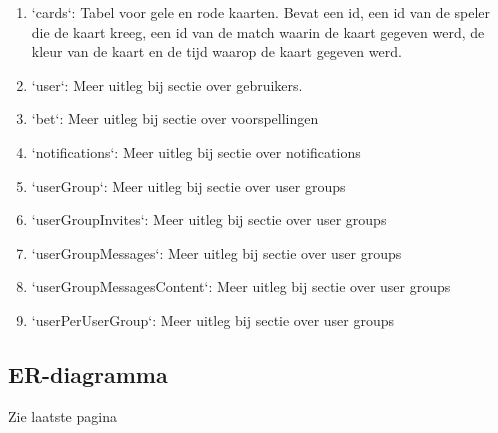 \documentclass[11pt, a4paper]{article}
\begin{document}
\begin{enumerate}
\item `cards`: Tabel voor gele en rode kaarten. Bevat een id, een id van de speler die de kaart kreeg, een id van de match waarin de kaart gegeven werd, de kleur van de kaart en de tijd waarop de kaart gegeven werd.
\item `user`: Meer uitleg bij sectie over gebruikers.
\item `bet`: Meer uitleg bij sectie over voorspellingen
\item `notifications`: Meer uitleg bij sectie over notifications
\item `userGroup`: Meer uitleg bij sectie over user groups
\item `userGroupInvites`: Meer uitleg bij sectie over user groups
\item `userGroupMessages`: Meer uitleg bij sectie over user groups
\item `userGroupMessagesContent`: Meer uitleg bij sectie over user groups
\item `userPerUserGroup`: Meer uitleg bij sectie over user groups

\end{enumerate}

\subsection{ER-diagramma}
Zie laatste pagina
\end{document}
